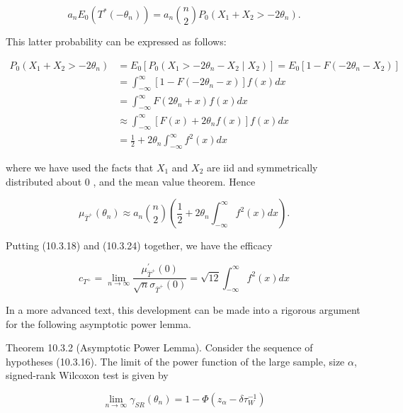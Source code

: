 \begin{equation*}
a_{n} E_{0}\left(T^{*}\left(-\theta_{n}\right)\right)=a_{n}\binom{n}{2} P_{0}\left(X_{1}+X_{2}>-2 \theta_{n}\right) . \tag{10.3.22}
\end{equation*}


This latter probability can be expressed as follows:


\begin{align*}
P_{0}\left(X_{1}+X_{2}>-2 \theta_{n}\right) & =E_{0}\left[P_{0}\left(X_{1}>-2 \theta_{n}-X_{2} \mid X_{2}\right)\right]=E_{0}\left[1-F\left(-2 \theta_{n}-X_{2}\right)\right] \\
& =\int_{-\infty}^{\infty}\left[1-F\left(-2 \theta_{n}-x\right)\right] f(x) d x \\
& =\int_{-\infty}^{\infty} F\left(2 \theta_{n}+x\right) f(x) d x \\
& \approx \int_{-\infty}^{\infty}\left[F(x)+2 \theta_{n} f(x)\right] f(x) d x \\
& =\frac{1}{2}+2 \theta_{n} \int_{-\infty}^{\infty} f^{2}(x) d x \tag{10.3.23}
\end{align*}


where we have used the facts that $X_{1}$ and $X_{2}$ are iid and symmetrically distributed about 0 , and the mean value theorem. Hence


\begin{equation*}
\mu_{\bar{T}^{+}}\left(\theta_{n}\right) \approx a_{n}\binom{n}{2}\left(\frac{1}{2}+2 \theta_{n} \int_{-\infty}^{\infty} f^{2}(x) d x\right) . \tag{10.3.24}
\end{equation*}


Putting (10.3.18) and (10.3.24) together, we have the efficacy


\begin{equation*}
c_{T^{+}}=\lim _{n \rightarrow \infty} \frac{\mu_{\bar{T}^{+}}^{\prime}(0)}{\sqrt{n} \sigma_{\bar{T}^{+}}(0)}=\sqrt{12} \int_{-\infty}^{\infty} f^{2}(x) d x \tag{10.3.25}
\end{equation*}


In a more advanced text, this development can be made into a rigorous argument for the following asymptotic power lemma.

Theorem 10.3.2 (Asymptotic Power Lemma). Consider the sequence of hypotheses (10.3.16). The limit of the power function of the large sample, size $\alpha$, signed-rank Wilcoxon test is given by


\begin{equation*}
\lim _{n \rightarrow \infty} \gamma_{S R}\left(\theta_{n}\right)=1-\Phi\left(z_{\alpha}-\delta \tau_{W}^{-1}\right) \tag{10.3.26}
\end{equation*}



